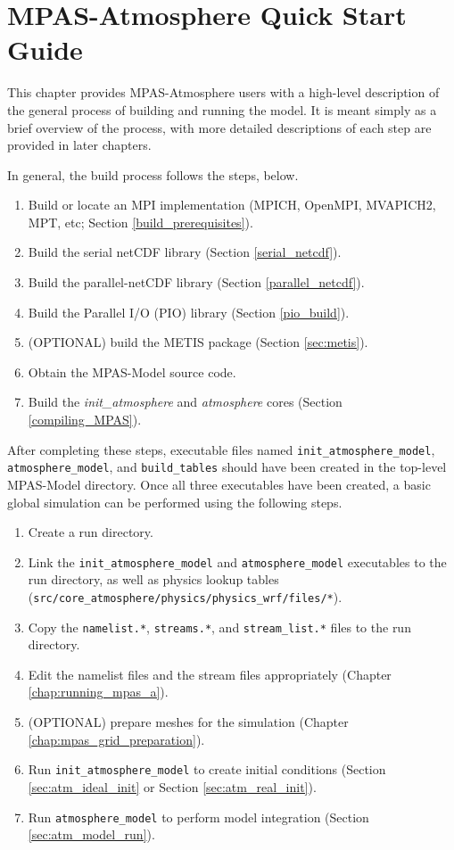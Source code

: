 \chapter{MPAS-Atmosphere Quick Start Guide}
\label{chap:quick_start}

This chapter provides MPAS-Atmosphere users with a high-level description of
the general process of building and running the model. It is meant simply as a brief overview of the
process, with more detailed descriptions of each step are provided in later chapters.

In general, the build process follows the steps, below.

\begin{enumerate}
	\item Build or locate an MPI implementation (MPICH, OpenMPI, MVAPICH2, MPT, etc; Section \ref{build_prerequisites}).
	\item Build the serial netCDF library (Section \ref{serial_netcdf}).
	\item Build the parallel-netCDF library (Section \ref{parallel_netcdf}).
	\item Build the Parallel I/O (PIO) library (Section \ref{pio_build}).
	\item (OPTIONAL) build the METIS package (Section \ref{sec:metis}).
	\item Obtain the MPAS-Model source code.
	\item Build the {\em init\_atmosphere} and {\em atmosphere} cores (Section \ref{compiling_MPAS}).
\end{enumerate}

After completing these steps, executable files named {\tt init\_atmosphere\_model}, 
{\tt atmosphere\_model}, and {\tt build\_tables} should have been created in the top-level MPAS-Model directory. Once
all three executables have been created, a basic global simulation can be performed using the following steps.

\begin{enumerate}
	\item Create a run directory.
	\item Link the {\tt init\_atmosphere\_model} and {\tt atmosphere\_model} executables to the run directory, as well as
physics lookup tables ({\tt src/core\_atmosphere/physics/physics\_wrf/files/*}).
	\item Copy the {\tt namelist.*}, {\tt streams.*}, and {\tt stream\_list.*} files to the run directory. 
	\item Edit the namelist files and the stream files appropriately (Chapter \ref{chap:running_mpas_a}).
	\item (OPTIONAL) prepare meshes for the simulation (Chapter \ref{chap:mpas_grid_preparation}).
	\item Run {\tt init\_atmosphere\_model} to create initial conditions (Section \ref{sec:atm_ideal_init} or Section \ref{sec:atm_real_init}).
        \item Run {\tt atmosphere\_model} to perform model integration (Section \ref{sec:atm_model_run}).
\end{enumerate}
